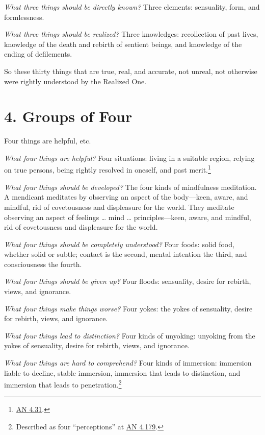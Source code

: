 \documentclass[12pt,openany]{book}%
\begin{document}
\emph{What three things should be directly known?} Three elements: sensuality, form, and formlessness. 

\emph{What three things should be realized?} Three knowledges: recollection of past lives, knowledge of the death and rebirth of sentient beings, and knowledge of the ending of defilements. 

So these thirty things that are true, real, and accurate, not unreal, not otherwise were rightly understood by the Realized One. 

\section*{4. Groups of Four }

Four things are helpful, etc. 

\emph{What four things are helpful?} Four situations: living in a suitable region, relying on true persons, being rightly resolved in oneself, and past merit.\footnote{\href{https://suttacentral.net/an4.31/en/sujato}{AN 4.31}. } 

\emph{What four things should be developed?} The four kinds of mindfulness meditation. A mendicant meditates by observing an aspect of the body—keen, aware, and mindful, rid of covetousness and displeasure for the world. They meditate observing an aspect of feelings … mind … principles—keen, aware, and mindful, rid of covetousness and displeasure for the world. 

\emph{What four things should be completely understood?} Four foods: solid food, whether solid or subtle; contact is the second, mental intention the third, and consciousness the fourth. 

\emph{What four things should be given up?} Four floods: sensuality, desire for rebirth, views, and ignorance. 

\emph{What four things make things worse?} Four yokes: the yokes of sensuality, desire for rebirth, views, and ignorance. 

\emph{What four things lead to distinction?} Four kinds of unyoking: unyoking from the yokes of sensuality, desire for rebirth, views, and ignorance. 

\emph{What four things are hard to comprehend?} Four kinds of immersion: immersion liable to decline, stable immersion, immersion that leads to distinction, and immersion that leads to penetration.\footnote{Described as four “perceptions” at \href{https://suttacentral.net/an4.179/en/sujato}{AN 4.179}. } 
\end{document}
